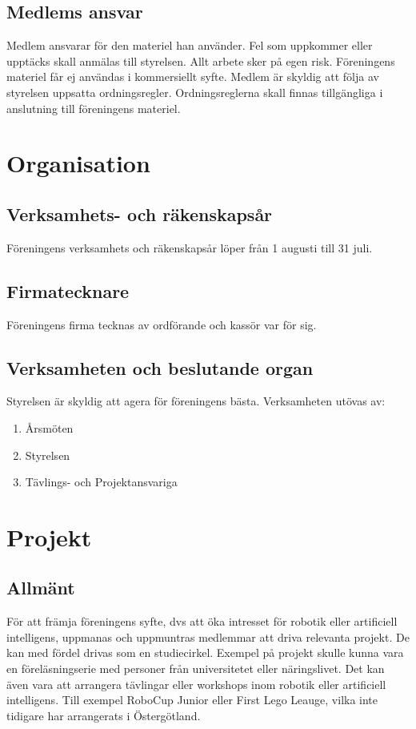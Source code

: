 \documentclass[11pt,a4paper]{article}
\begin{document}
\subsection{Medlems ansvar}
Medlem ansvarar för den materiel han använder. Fel som uppkommer eller upptäcks skall anmälas till styrelsen.
Allt arbete sker på egen risk.
Föreningens materiel får ej användas i kommersiellt syfte. Medlem är skyldig att följa av styrelsen uppsatta ordningsregler. Ordningsreglerna skall finnas tillgängliga i anslutning till föreningens materiel.



\section{Organisation}

\subsection{Verksamhets- och räkenskapsår}
Föreningens verksamhets och räkenskapsår löper från 1 augusti till 31 juli.
\subsection{Firmatecknare}
Föreningens firma tecknas av ordförande och kassör var för sig. 
\subsection{Verksamheten och beslutande organ}
Styrelsen är skyldig att agera för föreningens bästa. Verksamheten utövas av:
\begin{enumerate}
\item Årsmöten
\item Styrelsen
\item Tävlings- och Projektansvariga
\end{enumerate}


\section{Projekt}

\subsection{Allmänt}
För att främja föreningens syfte, dvs att öka intresset för robotik eller artificiell intelligens, uppmanas och uppmuntras medlemmar att driva relevanta projekt. De kan med fördel drivas som en studiecirkel. 
Exempel på projekt skulle kunna vara en föreläsningserie med personer från universitetet eller näringslivet.
Det kan även vara att arrangera tävlingar eller workshops inom robotik eller artificiell intelligens. Till exempel RoboCup Junior eller First Lego Leauge, vilka inte tidigare har arrangerats i Östergötland. 
\end{document}

